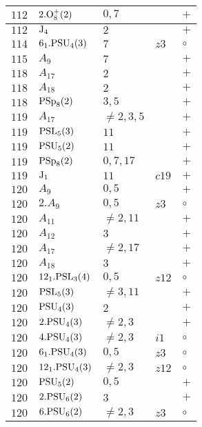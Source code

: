 \documentclass[a4paper, 11pt]{article}
\begin{document}
\begin{longtable}{lllll}
		$112$ & $2.{\rm O}_{8}^+(2)$ & $0,7$ &  & $+$ \\ \hline
		$112$ & ${\rm J}_{4}$ & $2$ &  & $+$ \\ \hline
		$114$ & $6_1.{\rm PSU}_{4}(3)$ & $7$ & $z3$ & $\circ$ \\ \hline
		$115$ & $A_{9}$ & $7$ &  & $+$ \\ \hline
		$118$ & $A_{17}$ & $2$ &  & $+$ \\ \hline
		$118$ & $A_{18}$ & $2$ &  & $+$ \\ \hline
		$118$ & ${\rm PSp}_{8}(2)$ & $3,5$ &  & $+$ \\ \hline
		$119$ & $A_{17}$ & $\neq 2,3,5$ &  & $+$ \\ \hline
		$119$ & ${\rm PSL}_{5}(3)$ & $11$ &  & $+$ \\ \hline
		$119$ & ${\rm PSU}_{5}(2)$ & $11$ &  & $+$ \\ \hline
		$119$ & ${\rm PSp}_{8}(2)$ & $0,7,17$ &  & $+$ \\ \hline
		$119$ & ${\rm J}_1$ & $11$ & $c19$ & $+$ \\ \hline
		$120$ & $A_{9}$ & $0,5$ &  & $+$ \\ \hline
		$120$ & $2.A_{9}$ & $0,5$ & $z3$ & $\circ$ \\ \hline
		$120$ & $A_{11}$ & $\neq 2,11$ &  & $+$ \\ \hline
		$120$ & $A_{12}$ & $3$ &  & $+$ \\ \hline
		$120$ & $A_{17}$ & $\neq 2,17$ &  & $+$ \\ \hline
		$120$ & $A_{18}$ & $3$ &  & $+$ \\ \hline
		$120$ & $12_1.{\rm PSL}_{3}(4)$ & $0,5$ & $z12$ & $\circ$ \\ \hline
		$120$ & ${\rm PSL}_{5}(3)$ & $\neq 3,11$ &  & $+$ \\ \hline
		$120$ & ${\rm PSU}_{4}(3)$ & $2$ &  & $+$ \\ \hline
		$120$ & $2.{\rm PSU}_{4}(3)$ & $\neq 2,3$ &  & $+$ \\ \hline
		$120$ & $4.{\rm PSU}_{4}(3)$ & $\neq 2,3$ & $i1$ & $\circ$ \\ \hline
		$120$ & $6_1.{\rm PSU}_{4}(3)$ & $0,5$ & $z3$ & $\circ$ \\ \hline
		$120$ & $12_1.{\rm PSU}_{4}(3)$ & $\neq 2,3$ & $z12$ & $\circ$ \\ \hline
		$120$ & ${\rm PSU}_{5}(2)$ & $0,5$ &  & $+$ \\ \hline
		$120$ & $2.{\rm PSU}_{6}(2)$ & $3$ &  & $+$ \\ \hline
		$120$ & $6.{\rm PSU}_{6}(2)$ & $\neq 2,3$ & $z3$ & $\circ$ \\ \hline

\end{longtable}
\end{document}
